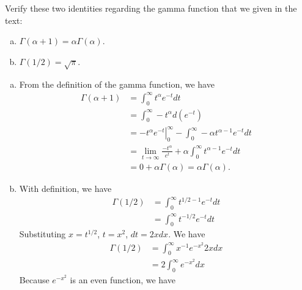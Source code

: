 \documentclass[14pt]{elegantbook}
\begin{document}

\setcounter{chapter}{5}
\chapter{}
    \setcounter{chapter}{3}
    \setcounter{exer}{15}
    \begin{exercise}
        Verify these two identities regarding the gamma function that we given in the text: 
        \begin{enumerate}[(a)]
            \item $\Gamma(\alpha+1) = \alpha\Gamma(\alpha)$. 
            \item $\Gamma(1/2)=\sqrt{\pi}$. 
        \end{enumerate}
    \end{exercise}

    \begin{solution}
        \begin{enumerate}[(a)]
            \item From the definition of the gamma function, we have
            \begin{align*}
                \Gamma(\alpha+1)&=\int_{0}^{\infty}t^\alpha e^{-t}dt\\
                &=\int_{0}^{\infty}-t^\alpha d(e^{-t})\\
                &=\left.-t^\alpha e^{-t}\right|_0^\infty-\int_{0}^{\infty}-\alpha t^{\alpha-1} e^{-t}dt\\
                &=\lim_{t\to\infty}\frac{-t^\alpha}{e^t}+\alpha\int_{0}^{\infty} t^{\alpha-1} e^{-t}dt\\
                &=0+\alpha\Gamma(\alpha)=\alpha\Gamma(\alpha).
            \end{align*}
            \item With definition, we have
            \begin{align*}
                \Gamma(1/2)&=\int_{0}^{\infty}t^{1/2-1} e^{-t}dt\\
                &=\int_{0}^{\infty}t^{-1/2} e^{-t}dt
            \end{align*}
            Substituting $x=t^{1/2}$, $t=x^2$, $dt=2xdx$. We have
            \begin{align*}
                \Gamma(1/2)&=\int_{0}^{\infty}x^{-1} e^{-x^2}2xdx\\
                &=2\int_{0}^{\infty} e^{-x^2}dx
            \end{align*}
            Because $e^{-x^2}$ is an even function, we have
            \begin{align*}

\end{align*}
\end{enumerate}
\end{solution}
\end{document}
